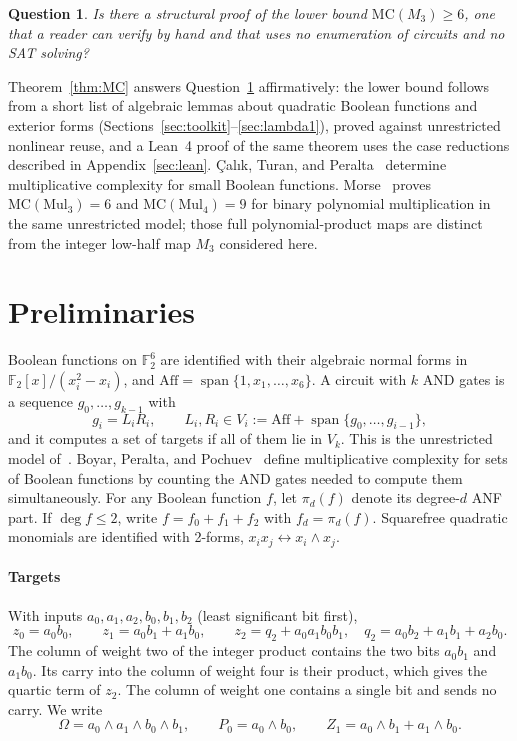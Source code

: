 \documentclass[11pt,a4paper]{article}
\theoremstyle{plain}
\theoremstyle{remark}
\theoremstyle{plain}
\newtheorem{question}[theorem]{Question}
\newcommand{\F}{\mathbb F_2}
\newcommand{\Aff}{\mathrm{Aff}}
\newcommand{\Span}{\operatorname{span}}
\begin{document}
\begin{question}\label{q:structural}
Is there a structural proof of the lower bound $\mathrm{MC}(M_3)\ge6$, one that a reader can verify by hand and that uses no enumeration of circuits and no SAT solving?
\end{question}

Theorem~\ref{thm:MC} answers Question~\ref{q:structural} affirmatively: the lower bound follows from a short list of algebraic lemmas about quadratic Boolean functions and exterior forms (Sections~\ref{sec:toolkit}--\ref{sec:lambda1}), proved against unrestricted nonlinear reuse, and a Lean~4 proof of the same theorem uses the case reductions described in Appendix~\ref{sec:lean}. \c{C}al{\i}k, Turan, and Peralta~\cite{ctp} determine multiplicative complexity for small Boolean functions. Morse~\cite{morse} proves $\mathrm{MC}(\mathrm{Mul}_3)=6$ and $\mathrm{MC}(\mathrm{Mul}_4)=9$ for binary polynomial multiplication in the same unrestricted model; those full polynomial-product maps are distinct from the integer low-half map $M_3$ considered here.

\section{Preliminaries}\label{sec:preliminaries}

Boolean functions on $\F^6$ are identified with their algebraic normal forms in $\F[x]/(x_i^2-x_i)$, and $\Aff=\Span\{1,x_1,\dots,x_6\}$. A circuit with $k$ AND gates is a sequence $g_0,\dots,g_{k-1}$ with
\[
  g_i=L_iR_i,\qquad L_i,R_i\in V_i:=\Aff+\Span\{g_0,\dots,g_{i-1}\},
\]
and it computes a set of targets if all of them lie in $V_k$. This is the unrestricted model of~\cite{morse}. Boyar, Peralta, and Pochuev~\cite{bpp} define multiplicative complexity for sets of Boolean functions by counting the AND gates needed to compute them simultaneously. For any Boolean function $f$, let $\pi_d(f)$ denote its degree-$d$ ANF part. If $\deg f\le2$, write $f=f_0+f_1+f_2$ with $f_d=\pi_d(f)$. Squarefree quadratic monomials are identified with 2-forms, $x_ix_j\leftrightarrow x_i\wedge x_j$.

\paragraph{Targets}
With inputs $a_0,a_1,a_2,b_0,b_1,b_2$ (least significant bit first),
\[
  z_0=a_0b_0,\qquad z_1=a_0b_1+a_1b_0,\qquad z_2=q_2+a_0a_1b_0b_1,\quad q_2=a_0b_2+a_1b_1+a_2b_0 .
\]
The column of weight two of the integer product contains the two bits $a_0b_1$
and $a_1b_0$. Its carry into the column of weight four is their product, which
gives the quartic term of $z_2$. The column of weight one contains a single
bit and sends no carry.
We write
\[
  \Omega=a_0\wedge a_1\wedge b_0\wedge b_1,\qquad P_0=a_0\wedge b_0,\qquad Z_1=a_0\wedge b_1+a_1\wedge b_0 .
\]
\end{document}
